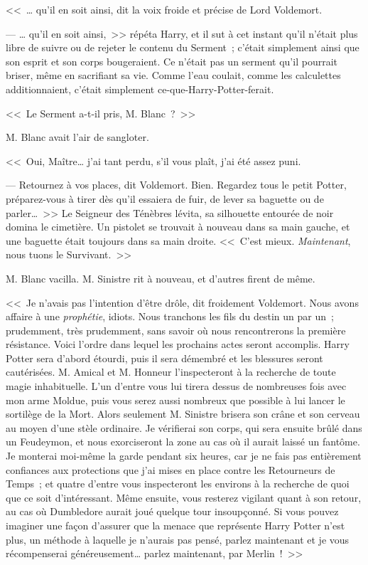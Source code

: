 <<~… qu'il en soit ainsi, dit la voix froide et précise de Lord Voldemort.

--- … qu'il en soit ainsi,~>> répéta Harry, et il sut à cet instant qu'il n'était plus libre de suivre ou de rejeter le contenu du Serment~; c'était simplement ainsi que son esprit et son corps bougeraient. Ce n'était pas un serment qu'il pourrait briser, même en sacrifiant sa vie. Comme l'eau coulait, comme les calculettes additionnaient, c'était simplement ce-que-Harry-Potter-ferait.

<<~Le Serment a-t-il pris, M. Blanc~?~>>

M. Blanc avait l'air de sangloter.

<<~Oui, Maître… j'ai tant perdu, s'il vous plaît, j'ai été assez puni.

--- Retournez à vos places, dit Voldemort. Bien. Regardez tous le petit Potter, préparez-vous à tirer dès qu'il essaiera de fuir, de lever sa baguette ou de parler…~>> Le Seigneur des Ténèbres lévita, sa silhouette entourée de noir domina le cimetière. Un pistolet se trouvait à nouveau dans sa main gauche, et une baguette était toujours dans sa main droite. <<~C'est mieux. \emph{Maintenant}, nous tuons le Survivant.~>>

M. Blanc vacilla. M. Sinistre rit à nouveau, et d'autres firent de même.

<<~Je n'avais pas l'intention d'être drôle, dit froidement Voldemort. Nous avons affaire à une \emph{prophétie}, idiots. Nous tranchons les fils du destin un par un~; prudemment, très prudemment, sans savoir où nous rencontrerons la première résistance. Voici l'ordre dans lequel les prochains actes seront accomplis. Harry Potter sera d'abord étourdi, puis il sera démembré et les blessures seront cautérisées. M. Amical et M. Honneur l'inspecteront à la recherche de toute magie inhabituelle. L'un d'entre vous lui tirera dessus de nombreuses fois avec mon arme Moldue, puis vous serez aussi nombreux que possible à lui lancer le sortilège de la Mort. Alors seulement M. Sinistre brisera son crâne et son cerveau au moyen d'une stèle ordinaire. Je vérifierai son corps, qui sera ensuite brûlé dans un Feudeymon, et nous exorciseront la zone au cas où il aurait laissé un fantôme. Je monterai moi-même la garde pendant six heures, car je ne fais pas entièrement confiances aux protections que j'ai mises en place contre les Retourneurs de Temps~; et quatre d'entre vous inspecteront les environs à la recherche de quoi que ce soit d'intéressant. Même ensuite, vous resterez vigilant quant à son retour, au cas où Dumbledore aurait joué quelque tour insoupçonné. Si vous pouvez imaginer une façon d'assurer que la menace que représente Harry Potter n'est plus, un méthode à laquelle je n'aurais pas pensé, parlez maintenant et je vous récompenserai généreusement… parlez maintenant, par Merlin~!~>>

